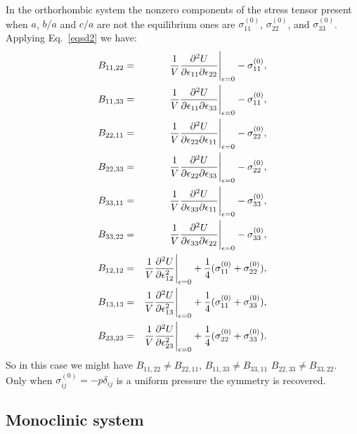 \documentclass[12pt,a4paper,twoside]{report}
\begin{document}
In the orthorhombic system the nonzero components of the stress tensor 
present when $a$, $b/a$ and $c/a$ are not the equilibrium ones are
$\sigma^{(0)}_{11}$, $\sigma^{(0)}_{22}$, and $\sigma^{(0)}_{33}$.
Applying Eq.~\ref{eqsd2} we have:
\begin{eqnarray}
B_{11,22} &=& {1 \over V}{\partial^2 U \over \partial \epsilon_{11} 
\partial \epsilon_{22}}\Bigg|_{\epsilon=0} - \sigma^{(0)}_{11}, \\
B_{11,33} &=& {1 \over V}{\partial^2 U \over \partial \epsilon_{11} 
\partial \epsilon_{33}}\Bigg|_{\epsilon=0} - \sigma^{(0)}_{11}, \\
B_{22,11} &=& {1 \over V}{\partial^2 U \over \partial \epsilon_{22} 
\partial \epsilon_{11}}\Bigg|_{\epsilon=0} - \sigma^{(0)}_{22}, \\
B_{22,33} &=& {1 \over V}{\partial^2 U \over \partial \epsilon_{22} 
\partial \epsilon_{33}}\Bigg|_{\epsilon=0} - \sigma^{(0)}_{22}, \\
B_{33,11} &=& {1 \over V}{\partial^2 U \over \partial \epsilon_{33} 
\partial \epsilon_{11}}\Bigg|_{\epsilon=0} - \sigma^{(0)}_{33}, \\
B_{33,22} &=& {1 \over V}{\partial^2 U \over \partial \epsilon_{33} 
\partial \epsilon_{22}}\Bigg|_{\epsilon=0} - \sigma^{(0)}_{33}, \\
B_{12,12} &=& {1 \over V}{\partial^2 U \over \partial \epsilon_{12}^2 }\Bigg|_{\epsilon=0} + {1\over 4} (\sigma^{(0)}_{11} +\sigma^{(0)}_{22}), \\
B_{13,13} &=& {1 \over V}{\partial^2 U \over \partial \epsilon_{13}^2}\Bigg|_{\epsilon=0} + {1\over 4} (\sigma^{(0)}_{11}+\sigma^{(0)}_{33}), \\
B_{23,23} &=& {1 \over V}{\partial^2 U \over \partial \epsilon_{23}^2 }\Bigg|_{\epsilon=0} + {1\over 4} (\sigma^{(0)}_{22}+\sigma^{(0)}_{33}).
\end{eqnarray}
So in this case we might have $B_{11,22} \ne B_{22,11}$, 
$B_{11,33} \ne B_{33,11}$ $B_{22,33} \ne B_{33,22}$. 
Only when $\sigma^{(0)}_{ij}=-p\delta_{ij}$
is a uniform pressure the symmetry is recovered.

{\color{web-blue}\subsection{Monoclinic system}}
\color{black}
\end{document}
